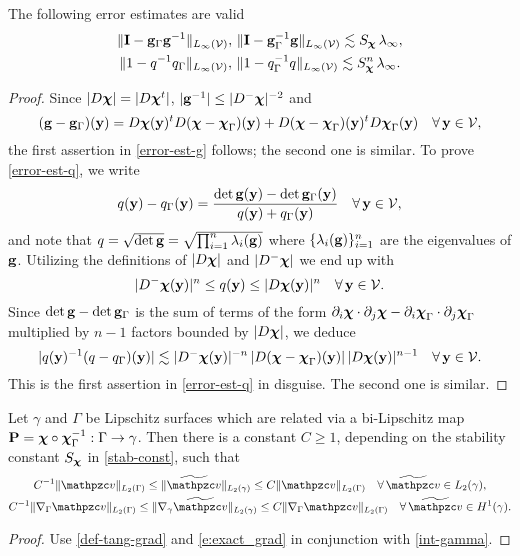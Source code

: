 \begin{lemma}\label{L:error-est}
The following error estimates are valid
%
\begin{gather}\label{error-est-g}
  \|{\bf I}-{\bf g}_\Gamma{\bf g}^{-1}\|_{L_\infty(\mathcal{V})}, \,
  \|{\bf I}-{\bf g}_\Gamma^{-1}{\bf g}\|_{L_\infty(\mathcal{V})}
  \lesssim S_{\boldsymbol \chi} \, \lambda_\infty,
\\ \label{error-est-q}
  \|1-q^{-1}q_\Gamma\|_{L_\infty(\mathcal{V})}, \, \|1-q_\Gamma^{-1}q\|_{L_\infty(\mathcal{V})}
  \lesssim S_{\boldsymbol \chi}^n \, \lambda_\infty.
\end{gather}
%
\end{lemma}
%
\begin{proof}
  Since $|D{\boldsymbol \chi}|=|D{\boldsymbol \chi}^t|$, $|{\bf g}^{-1}| \le |D^-{\boldsymbol \chi}|^{-2}$ and
%  
\[
({\bf g} - {\bf g}_\Gamma)({\bf y}) =
D{\boldsymbol \chi}({\bf y})^t D({\boldsymbol \chi}-{\boldsymbol \chi}_\Gamma)({\bf y})
+ D({\boldsymbol \chi}-{\boldsymbol \chi}_\Gamma)({\bf y})^t D{\boldsymbol \chi}_\Gamma({\bf y})
\quad\forall \, {\bf y}\in\mathcal{V},
\]
%
the first assertion in \eqref{error-est-g} follows; the second one is similar.
To prove \eqref{error-est-q}, we write
%
\[
q({\bf y}) - q_\Gamma({\bf y}) = \frac{\det{\bf g}({\bf y}) - \det{\bf g}_\Gamma({\bf y})}{q({\bf y})+q_\Gamma({\bf y})}
\quad\forall \, {\bf y}\in\mathcal{V},
\]
%
and note that $q = \sqrt{\det{\bf g}}=\sqrt{\prod_{i=1}^n \lambda_i({\bf g})}$ where
$\{\lambda_i({\bf g})\}_{i=1}^n$ are the eigenvalues of ${\bf g}$. Utilizing the definitions
of $|D{\boldsymbol \chi}|$ and $|D^-{\boldsymbol \chi}|$ we end up with
%
\begin{equation}\label{q:nondegen}
|D^-{\boldsymbol \chi}({\bf y})|^n \le q({\bf y}) \le |D{\boldsymbol \chi}({\bf y})|^n
\quad\forall \, {\bf y}\in\mathcal{V}.
\end{equation}
%
Since $\det{\bf g} - \det{\bf g}_\Gamma$ is the sum of terms of the form
$\partial_i{\boldsymbol \chi}\cdot\partial_j{\boldsymbol \chi} - \partial_i{\boldsymbol \chi}_\Gamma\cdot\partial_j{\boldsymbol \chi}_\Gamma$
multiplied by $n-1$ factors bounded by $|D{\boldsymbol \chi}|$, we deduce
%
\[
|q({\bf y})^{-1}(q-q_\Gamma)({\bf y})| \lesssim
|D^-{\boldsymbol \chi}({\bf y})|^{-n} \, |D({\boldsymbol \chi}-{\boldsymbol \chi}_\Gamma)({\bf y})| \, |D{\boldsymbol \chi}({\bf y})|^{n-1}
\quad\forall \, {\bf y}\in\mathcal{V}.
\]
%
This is the first assertion in \eqref{error-est-q} in disguise. The second one
is similar.
\end{proof}

\begin{lemma}\label{L:norm-equiv}
Let $\gamma$ and $\Gamma$ be Lipschitz surfaces which are related via a bi-Lipschitz map ${\bf P}={\boldsymbol \chi} \circ {\boldsymbol \chi}^{-1}_\Gamma :\Gamma \rightarrow \gamma$. Then there is a constant $C \ge 1$, depending on the stability constant $S_{\boldsymbol \chi}$ in \eqref{stab-const}, such that
\begin{gather}
\label{L2:equiv}
C^{-1} \|\tv\|_{L_2(\Gamma)} \le \|\ttv\|_{L_2(\gamma)}
\le C \|\tv\|_{L_2(\Gamma)}
\quad\forall \, \ttv \in L_2(\gamma),
\\ \label{H1:equiv}
C^{-1} \|\nabla_\Gamma \tv\|_{L_2(\Gamma)} \le \|\nabla_\gamma \ttv\|_{L_2(\gamma)}
\le C \|\nabla_\Gamma \tv\|_{L_2(\Gamma)}
\quad\forall \, \ttv \in H^1(\gamma).
\end{gather}
\end{lemma}
%
\begin{proof}
Use \eqref{def-tang-grad} and \eqref{e:exact_grad} in conjunction with \eqref{int-gamma}.
\end{proof}  
  
